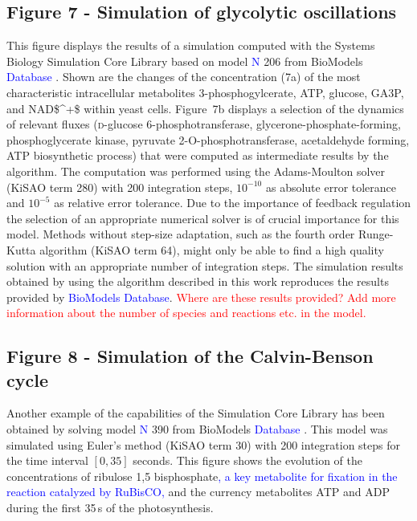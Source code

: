 \documentclass[10pt]{bmc_article}
\newcommand{\numero}{\mbox{N\hspace{-0.075em}\raisebox{0.25em}{\relsize{-2}\b{o}}}}
\newenvironment{bmcformat}{\fussy\setboolean{publ}{true}}{\fussy}
\newcommand{\COR}[1]                      {\textcolor{blue}{#1}}
\newcommand{\TODO}[1]                     {\textcolor{red}{#1}}
\begin{document}
\begin{bmcformat}
\subsection*{Figure 7 - Simulation of glycolytic oscillations}
This figure displays the results of a simulation computed with the Systems
Biology Simulation Core Library based on model \COR{\numero} 206 from BioModels \COR{Database}
\cite{Novere2006a, Wolf2000}.
Shown are the changes of the concentration (7a) of the most characteristic
intracellular metabolites 3-phosphogylcerate, \acs{ATP}, glucose, \acf{GA3P},
and \acs{NAD$^+$} within yeast cells.
Figure~7b displays a selection of the dynamics of relevant fluxes 
(\textsc{d}-glucose 6-phosphotransferase, glycerone-phosphate-forming,
phosphoglycerate kinase, pyruvate 2-O-phosphotransferase, acetaldehyde forming,
\acs{ATP} biosynthetic process)
that were computed as intermediate results by the algorithm.
The computation was performed using the Adams-Moulton solver \cite{Hairer2000}
(\acs{KiSAO} term 280) with 200 integration steps, $10^{-10}$ as absolute error
tolerance and $10^{-5}$ as relative error tolerance.
Due to the importance of feedback regulation the selection of an appropriate
numerical solver is of crucial importance for this model.
Methods without step-size adaptation, such as the fourth order Runge-Kutta
algorithm (\acs{KiSAO} term 64), might only be able to find a high quality solution 
with an appropriate number of integration steps. 
The simulation results obtained by using the algorithm described in this work
reproduces the results provided by \COR{BioModels Database}.
\TODO{Where are these results provided?}
\TODO{Add more information about the number of species and reactions etc. in the model.}

\subsection*{Figure 8 - Simulation of the Calvin-Benson cycle}
Another example of the capabilities of the Simulation Core Library has been
obtained by solving model \COR{\numero} 390 from BioModels \COR{Database} 
\cite{Novere2006a, Arnold2011}.
This model was simulated using Euler's method (\acs{KiSAO} term 30) with 200
integration steps for the time interval $[0, 35]$ seconds.
This figure shows the evolution of the concentrations of ribulose 1,5
bisphosphate\COR{, a key metabolite for  fixation in the reaction catalyzed by \acf{RuBisCO},} and the currency metabolites \acs{ATP} and \acs{ADP} during the first 35\,s of
the photosynthesis.



\end{bmcformat}
\end{document}
